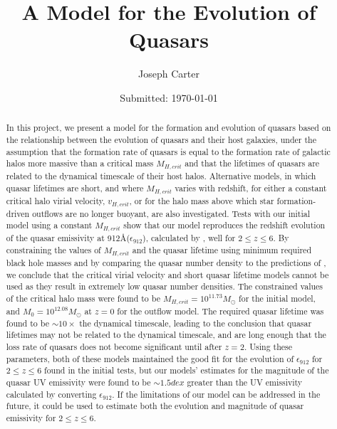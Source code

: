 \documentclass[12pt]{article}%
\begin{document}
                     
\onecolumngrid


\title{A Model for the Evolution of Quasars} 
\date{Submitted: \today{}}
\author{Joseph Carter}

\maketitle

\begin{abstract}
 
\noindent In this project, we present a model for the formation and evolution of quasars based on the relationship between the evolution of quasars and their host galaxies, under the assumption that the formation rate of quasars is equal to the formation rate of galactic halos more massive than a critical mass $M_{H,crit}$ and that the lifetimes of quasars are related to the dynamical timescale of their host halos. Alternative models, in which quasar lifetimes are short, and where $M_{H,crit}$ varies with redshift, for either a constant critical halo virial velocity, $v_{H,crit}$, or for the halo mass above which star formation-driven outflows are no longer buoyant, are also investigated. Tests with our initial model using a constant $M_{H,crit}$ show that our model reproduces the redshift evolution of the quasar emissivity at 912\AA ($\epsilon_{912}$), calculated by \cite{Haardt_Madau}, well for $2\leq z\leq6$. By constraining the values of $M_{H,crit}$ and the quasar lifetime using minimum required black hole masses and by comparing the quasar number density to the predictions of \cite{Hopkins}, we conclude that the critical virial velocity and short quasar lifetime models cannot be used as they result in extremely low quasar number densities. The constrained values of the critical halo mass were found to be $M_{H,crit}=10^{11.73}M_\odot$ for the initial model, and $M_0=10^{12.08}M_\odot$ at $z=0$ for the outflow model. The required quasar lifetime was found to be $\sim10\times$ the dynamical timescale, leading to the conclusion that quasar lifetimes may not be related to the dynamical timescale, and are long enough that the loss rate of quasars does not become significant until after $z=2$. Using these parameters, both of these models maintained the good fit for the evolution of $\epsilon_{912}$ for $2\leq z\leq6$ found in the initial tests, but our models' estimates for the magnitude of the quasar UV emissivity were found to be $\sim1.5dex$ greater than the UV emissivity calculated by converting $\epsilon_{912}$. If the limitations of our model can be addressed in the future, it could be used to estimate both the evolution and magnitude of quasar emissivity for $2\leq z\leq6$.

\end{abstract}
\end{document}
